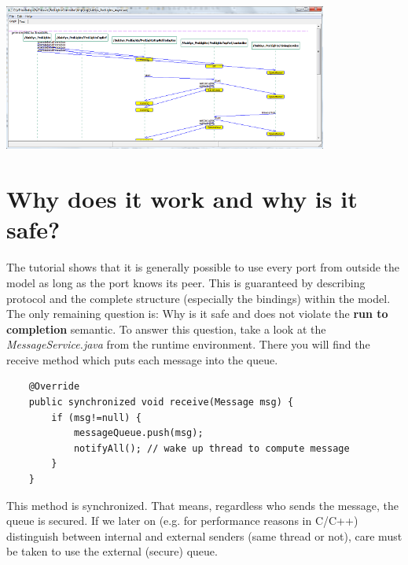 \includegraphics[width=0.8\textwidth]{images/030-PedLights04.png}

\section{Why does it work and why is it safe?}

The tutorial shows that it is generally possible to use every port from outside the model as long as the port knows its peer. This is guaranteed by describing protocol and the complete structure (especially the bindings) within the model. 
The only remaining question is: Why is it safe and does not violate the \textbf{run to completion} semantic. To answer this question, take a look at the \textit{MessageService.java} from the runtime environment. There you will find the receive method which puts each message into the queue. 

\begin{verbatim}
    @Override
    public synchronized void receive(Message msg) {
        if (msg!=null) {
            messageQueue.push(msg);
            notifyAll(); // wake up thread to compute message
        }
    }
\end{verbatim}

This method is synchronized. That means, regardless who sends the message, the queue is secured. If we later on (e.g. for performance reasons in C/C++) distinguish between internal and external senders (same thread or not), care must be taken to use the external (secure) queue.
